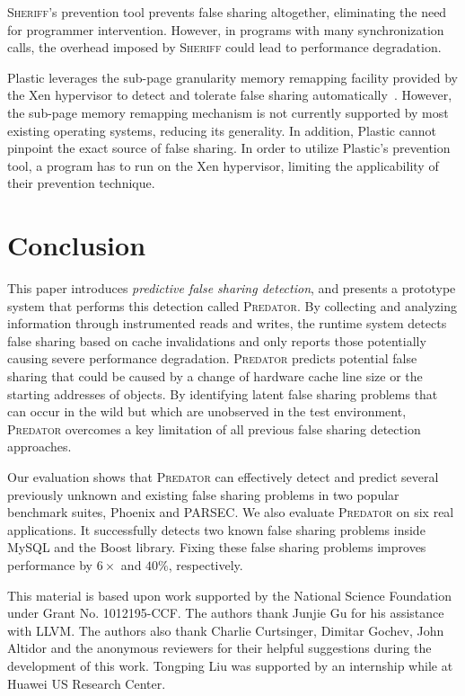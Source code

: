 \documentclass[10pt]{sigplanconf}
\newcommand{\Sheriff}{{\scshape Sheriff}}
\newcommand{\Predator}{{\scshape Predator}}
\begin{document}
\Sheriff{}'s prevention tool prevents false sharing altogether, eliminating the need for programmer intervention. However, in programs with many synchronization calls, the overhead imposed by \Sheriff{} could lead to performance degradation.

Plastic leverages the sub-page granularity memory remapping facility provided by the Xen hypervisor to detect and tolerate false sharing automatically~\cite{OSdetection}. However, the sub-page memory remapping mechanism is not currently supported by most existing operating systems, reducing its generality. In addition, Plastic cannot pinpoint the exact source of false sharing.  
In order to utilize Plastic's prevention tool, a program has to run on the Xen hypervisor, limiting the applicability of their prevention technique.

\section{Conclusion}
\label{sec:conclusion}
This paper introduces \emph{predictive false sharing detection}, and presents a prototype system that performs this detection called \Predator{}. By collecting and analyzing information through instrumented reads and writes, the runtime system detects false sharing based on cache invalidations and only reports those potentially causing severe performance degradation.
\Predator{} predicts potential false sharing that could be caused by a change of hardware cache line size or the starting addresses of objects. By identifying latent false sharing problems that can occur in the wild but which are unobserved in the test environment, \Predator{} overcomes a key limitation of
all previous false sharing detection approaches.

Our evaluation shows that \Predator{} can effectively detect and predict several previously unknown and existing false sharing problems in two popular benchmark suites, Phoenix and PARSEC. We also evaluate \Predator{} on six real applications. 
It successfully detects two known false sharing problems inside MySQL and the Boost library.
Fixing these false sharing problems improves performance by $6\times$ and $40\%$, respectively.


\acks
This material is based upon work supported by the National Science
Foundation under Grant No. 1012195-CCF. The authors thank Junjie Gu for his assistance with LLVM. The authors also thank Charlie Curtsinger, Dimitar Gochev, John Altidor and the anonymous reviewers for their helpful suggestions during the development of this work. Tongping Liu was supported by an internship while at Huawei US Research Center.
\end{document}
